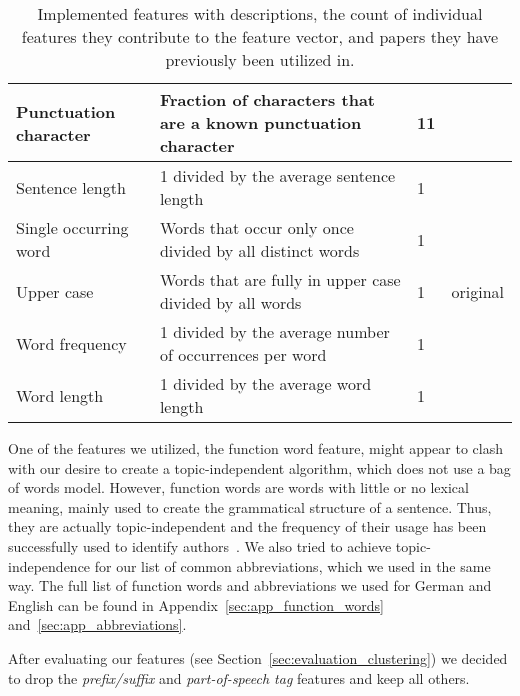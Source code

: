 \begin{savenotes}
\begin{table}[ht!]
\begin{center}
\begin{tabular}{p{2.6cm}|p{6cm}|p{1.2cm}|p{1.2cm}}
    Punctuation character   & Fraction of characters that are a known punctuation character             & 11                & \cite{madigan2005author} \cite{narayanan2012feasibility}\\ \hline
    Sentence length          & 1 divided by the average sentence length                                  & 1                 & \cite{de2001mining}\\ \hline
    Single occurring word    & Words that occur only once divided by all distinct words                  & 1                 & \cite{madigan2005author} \cite{narayanan2012feasibility}\\ \hline
    Upper case           & Words that are fully in upper case divided by all words                   & 1                 & original\\ \hline
    Word frequency           & 1 divided by the average number of occurrences per word                   & 1                 & \cite{madigan2005author} \cite{narayanan2012feasibility}\\ \hline
    Word length              & 1 divided by the average word length                                      & 1                 & \cite{argamon2003style} \cite{narayanan2012feasibility}\\
    \end{tabular}
    \end{center}
    \caption{Implemented features with descriptions, the count of individual features they contribute to the feature vector, and papers they have previously been utilized in.}
    \label{tab:featureTable}
\end{table}


One of the features we utilized, the function word feature, might appear to clash with our desire to create a topic-independent algorithm, which does not use a bag of words model.
However, function words are words with little or no lexical meaning, mainly used to create the grammatical structure of a sentence.
Thus, they are actually topic-independent and the frequency of their usage has been successfully used to identify authors~\cite{mosteller1962applied}.
We also tried to achieve topic-independence for our list of common abbreviations, which we used in the same way.
The full list of function words and abbreviations we used for German and English can be found in Appendix~\ref{sec:app_function_words} and~\ref{sec:app_abbreviations}.

\end{savenotes}

After evaluating our features (see Section~\ref{sec:evaluation_clustering}) we decided to drop the \textit{prefix/suffix} and \textit{part-of-speech tag} features and keep all others.



